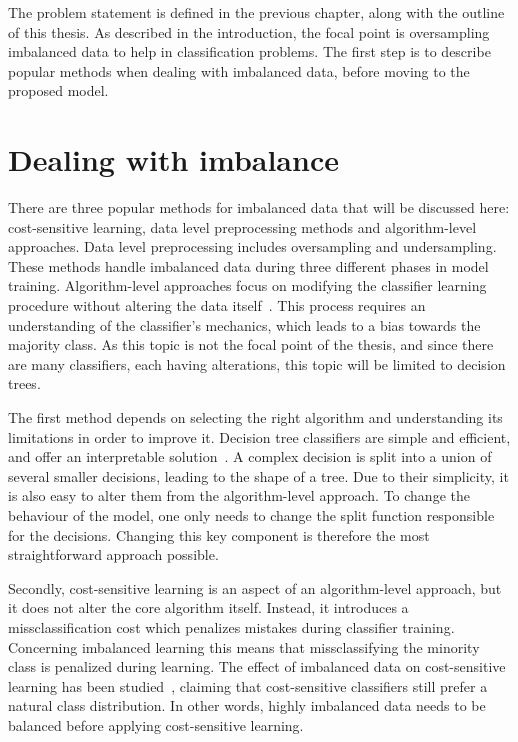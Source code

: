 The problem statement is defined in the previous chapter, along with the outline of this thesis. As described in the introduction, the focal point is oversampling imbalanced data to help in classification problems. The first step is to describe popular methods when dealing with imbalanced data, before moving to the proposed model.

\section{Dealing with imbalance}
There are three popular methods for imbalanced data that will be discussed here: cost-sensitive learning, data level preprocessing methods and algorithm-level approaches. Data level preprocessing includes oversampling and undersampling. These methods handle imbalanced data during three different phases in model training. Algorithm-level approaches focus on modifying the classifier learning procedure without altering the data itself~\cite{Fernandez2018LearningSets}. This process requires an understanding of the classifier's mechanics, which leads to a bias towards the majority class. As this topic is not the focal point of the thesis, and since there are many classifiers, each having alterations, this topic will be limited to decision trees.

The first method depends on selecting the right algorithm and understanding its limitations in order to improve it. Decision tree classifiers are simple and efficient, and offer an interpretable solution~\cite{Safavian1991AMethodology}. A complex decision is split into a union of several smaller decisions, leading to the shape of a tree. Due to their simplicity, it is also easy to alter them from the algorithm-level approach. To change the behaviour of the model, one only needs to change the split function responsible for the decisions. Changing this key component is therefore the most straightforward approach possible. 

Secondly, cost-sensitive learning is an aspect of an algorithm-level approach, but it does not alter the core algorithm itself. Instead, it introduces a missclassification cost which penalizes mistakes during classifier training. Concerning imbalanced learning this means that missclassifying the minority class is penalized during learning. The effect of imbalanced data on cost-sensitive learning has been studied~\cite{Liu2006TheStudy}, claiming that cost-sensitive classifiers still prefer a natural class distribution. In other words, highly imbalanced data needs to be balanced before applying cost-sensitive learning.

